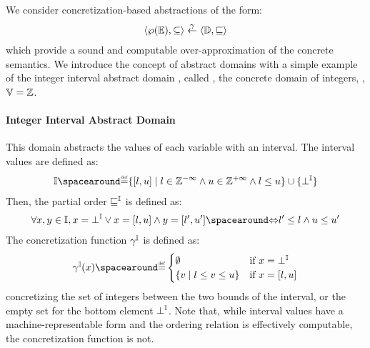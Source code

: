 We consider concretization-based abstractions of the form:
\begin{align*}
  \langle \wp(\mathbb{E}), \subseteq \rangle \overset{\gamma}{\leftarrow} \langle \mathbb{D}, \sqsubseteq \rangle
\end{align*}
which provide a sound and computable over-approximation of the concrete semantics.
  We introduce the concept of abstract domains with a simple example of the integer interval abstract domain , called \intervalname, \wrt{} the concrete domain of integers, \ie, $\mathbb{V} = \mathbb{Z}$.

\paragraph{Integer Interval Abstract Domain}
This domain abstracts the values of each variable with an interval. The interval values are defined as:
  \begin{align*}
    \intervaltype \DefeQ \setdef{\interval{l}{u}}{l \in \Zminus \land u \in \Zplus \land l \le u} \setjoin \{\intervalbottom\}
  \end{align*}
  Then, the partial order $\sqsubseteq^{\mathbb{I}}$ is defined as:
  \begin{align*}
    \forall x, y \in \intervaltype, x = \intervalbottom \lor x = \interval{l}{u} \land y = \interval{l'}{u'} \IfF l' \le l \land u \le u'
  \end{align*}
  The concretization function $\gamma^{\mathbb{I}}$ is defined as:
  \begin{align*}
    \intervalconcretization(x) \DefeQ \begin{cases}
      \emptyset & \text{if } x = \intervalbottom \\
      \setdef{v}{l \le v \le u} & \text{if } x = \interval{l}{u}
    \end{cases}
  \end{align*}
  concretizing the set of integers between the two bounds of the interval, or the empty set for the bottom element $\bot^{\mathbb{I}}$.
  Note that, while interval values have a machine-representable form and the ordering relation is effectively computable, the concretization function is not.

